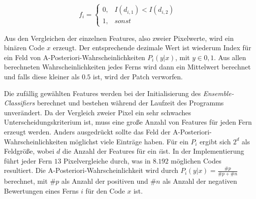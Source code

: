 	\begin{equation}
	f_{i}=\begin{cases}
	0, & I(d_{i,1})<I(d_{i,2})\\
	1, & sonst
	\end{cases}
	\end{equation}

	Aus den Vergleichen der einzelnen Features, also zweier Pixelwerte, wird ein binären Code $x$ erzeugt. Der entsprechende dezimale Wert ist wiederum Index für ein Feld von A-Posteriori-Wahrscheinlichkeiten $P_{i}(y|x)$, mit $y\in{0,1}$. Aus allen berechneten Wahrscheinlichkeiten jedes Ferns wird dann ein Mittelwert berechnet und falls diese kleiner als $0.5$ ist, wird der Patch verworfen.

	Die zufällig gewählten Features werden bei der Initialisierung des \textit{Ensemble-Classifiers} berechnet und bestehen während der Laufzeit des Programms unverändert. Da der Vergleich zweier Pixel ein sehr schwaches Unterscheidungskriterium ist, muss eine große Anzahl von Features für jeden Fern erzeugt werden. Anders ausgedrückt sollte das Feld der A-Posteriori-Wahrscheinlichkeiten möglichst viele Einträge haben. Für ein $P_{i}$ ergibt sich $2^{d}$ als Feldgröße, wobei $d$ die Anzahl der Features für ein $i$ist. In der Implementierung führt jeder Fern $13$ Pixelvergleiche durch, was in $8.192$ möglichen Codes resultiert. Die A-Posteriori-Wahrscheinlichkeit wird durch $P_{i}(y|x)=\frac{\#p}{\#p+\#n}$ berechnet, mit $\#p$ als Anzahl der positiven und $\#n$ als Anzahl der negativen Bewertungen eines Ferns $i$ für den Code $x$ ist.

